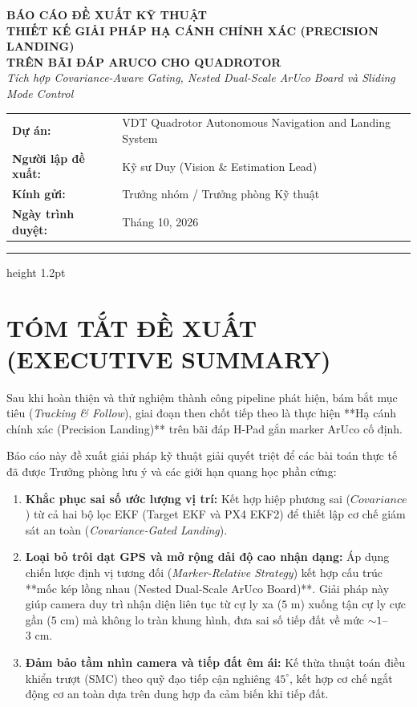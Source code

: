 \documentclass[12pt,a4paper]{article}
\begin{document}

\begin{center}
    {\large \textbf{BÁO CÁO ĐỀ XUẤT KỸ THUẬT}}\\[0.3em]
    {\LARGE \textbf{\color{blue!85!black}THIẾT KẾ GIẢI PHÁP HẠ CÁNH CHÍNH XÁC (PRECISION LANDING)\\ TRÊN BÃI ĐÁP ARUCO CHO QUADROTOR}}\\[0.4em]
    {\large \textit{Tích hợp Covariance-Aware Gating, Nested Dual-Scale ArUco Board và Sliding Mode Control}}
    \vspace{0.8em}
\end{center}

\begin{tabular}{ll}
    \textbf{Dự án:} & VDT Quadrotor Autonomous Navigation and Landing System \\
    \textbf{Người lập đề xuất:} & Kỹ sư Duy (Vision \& Estimation Lead) \\
    \textbf{Kính gửi:} & Trưởng nhóm / Trưởng phòng Kỹ thuật \\
    \textbf{Ngày trình duyệt:} & Tháng 10, 2026
\end{tabular}

\vspace{0.8em}
\hrule height 1.2pt
\vspace{1.2em}

\section*{TÓM TẮT ĐỀ XUẤT (EXECUTIVE SUMMARY)}
Sau khi hoàn thiện và thử nghiệm thành công pipeline phát hiện, bám bắt mục tiêu (\textit{Tracking \& Follow}), giai đoạn then chốt tiếp theo là thực hiện **Hạ cánh chính xác (Precision Landing)** trên bãi đáp H-Pad gắn marker ArUco cố định. 

Báo cáo này đề xuất giải pháp kỹ thuật giải quyết triệt để các bài toán thực tế đã được Trưởng phòng lưu ý và các giới hạn quang học phần cứng:
\begin{enumerate}[noitemsep,topsep=2pt]
    \item \textbf{Khắc phục sai số ước lượng vị trí:} Kết hợp hiệp phương sai ($Covariance$) từ cả hai bộ lọc EKF (Target EKF và PX4 EKF2) để thiết lập cơ chế giám sát an toàn (\textit{Covariance-Gated Landing}).
    \item \textbf{Loại bỏ trôi dạt GPS và mở rộng dải độ cao nhận dạng:} Áp dụng chiến lược định vị tương đối (\textit{Marker-Relative Strategy}) kết hợp cấu trúc **mốc kép lồng nhau (Nested Dual-Scale ArUco Board)**. Giải pháp này giúp camera duy trì nhận diện liên tục từ cự ly xa ($5\text{ m}$) xuống tận cự ly cực gần ($5\text{ cm}$) mà không lo tràn khung hình, đưa sai số tiếp đất về mức $\sim 1$--$3\text{ cm}$.
    \item \textbf{Đảm bảo tầm nhìn camera và tiếp đất êm ái:} Kế thừa thuật toán điều khiển trượt (SMC) theo quỹ đạo tiếp cận nghiêng $45^\circ$, kết hợp cơ chế ngắt động cơ an toàn dựa trên dung hợp đa cảm biến khi tiếp đất.
\end{enumerate}
\end{document}
